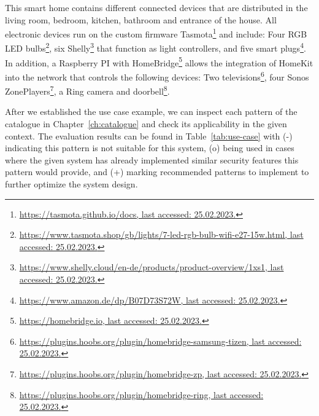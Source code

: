 This smart home contains different connected devices that are distributed in the living room, bedroom, kitchen, bathroom and entrance of the house. All electronic devices run on the custom firmware Tasmota\footnote{\href{https://tasmota.github.io/docs}{https://tasmota.github.io/docs, last accessed: 25.02.2023.}} and include: Four RGB LED  bulbs\footnote{\href{https://www.tasmota.shop/gb/lights/7-led-rgb-bulb-wifi-e27-15w.html}{https://www.tasmota.shop/gb/lights/7-led-rgb-bulb-wifi-e27-15w.html, last accessed: 25.02.2023.}}, six Shelly\footnote{\href{https://www.shelly.cloud/en-de/products/product-overview/1xs1}{https://www.shelly.cloud/en-de/products/product-overview/1xs1, last accessed: 25.02.2023.}} that function as light controllers, and five smart plugs\footnote{\href{https://www.amazon.de/dp/B07D73S72W}{https://www.amazon.de/dp/B07D73S72W, last accessed: 25.02.2023.}}. In addition, a Raspberry PI with HomeBridge\footnote{\href{https://homebridge.io}{https://homebridge.io, last accessed: 25.02.2023.}} allows the integration of HomeKit into the network that controls the following devices: Two televisions\footnote{\href{https://plugins.hoobs.org/plugin/homebridge-samsung-tizen}{https://plugins.hoobs.org/plugin/homebridge-samsung-tizen, last accessed: 25.02.2023.}}, four Sonos ZonePlayers\footnote{\href{https://plugins.hoobs.org/plugin/homebridge-zp}{https://plugins.hoobs.org/plugin/homebridge-zp, last accessed: 25.02.2023.}}, a Ring camera and doorbell\footnote{\href{https://plugins.hoobs.org/plugin/homebridge-ring}{https://plugins.hoobs.org/plugin/homebridge-ring, last accessed: 25.02.2023.}}.

After we established the use case example, we can inspect each pattern of the catalogue in Chapter~\ref{ch:catalogue} and check its applicability in the given context. The evaluation results can be found in Table~\ref{tab:use-case} with (-) indicating this pattern is not suitable for this system, (o) being used in cases where the given system has already implemented similar security features this pattern would provide, and (+) marking recommended patterns to implement to further optimize the system design.  

